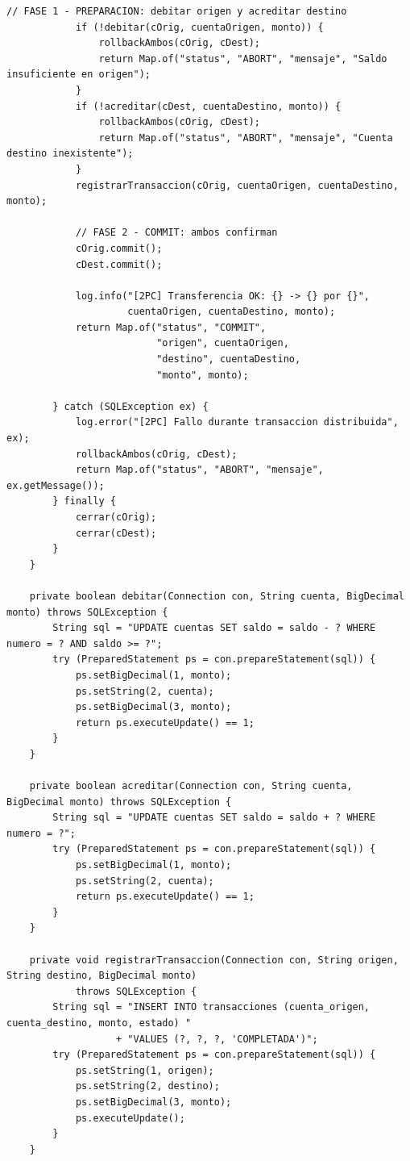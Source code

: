 \documentclass[11pt,a4paper]{article}
\begin{document}
\begin{lstlisting}[style=JavaStyle,caption={TransferenciaService.java: simulacion didactica de 2PC en capa de aplicacion}]
            // FASE 1 - PREPARACION: debitar origen y acreditar destino
            if (!debitar(cOrig, cuentaOrigen, monto)) {
                rollbackAmbos(cOrig, cDest);
                return Map.of("status", "ABORT", "mensaje", "Saldo insuficiente en origen");
            }
            if (!acreditar(cDest, cuentaDestino, monto)) {
                rollbackAmbos(cOrig, cDest);
                return Map.of("status", "ABORT", "mensaje", "Cuenta destino inexistente");
            }
            registrarTransaccion(cOrig, cuentaOrigen, cuentaDestino, monto);

            // FASE 2 - COMMIT: ambos confirman
            cOrig.commit();
            cDest.commit();

            log.info("[2PC] Transferencia OK: {} -> {} por {}",
                     cuentaOrigen, cuentaDestino, monto);
            return Map.of("status", "COMMIT",
                          "origen", cuentaOrigen,
                          "destino", cuentaDestino,
                          "monto", monto);

        } catch (SQLException ex) {
            log.error("[2PC] Fallo durante transaccion distribuida", ex);
            rollbackAmbos(cOrig, cDest);
            return Map.of("status", "ABORT", "mensaje", ex.getMessage());
        } finally {
            cerrar(cOrig);
            cerrar(cDest);
        }
    }

    private boolean debitar(Connection con, String cuenta, BigDecimal monto) throws SQLException {
        String sql = "UPDATE cuentas SET saldo = saldo - ? WHERE numero = ? AND saldo >= ?";
        try (PreparedStatement ps = con.prepareStatement(sql)) {
            ps.setBigDecimal(1, monto);
            ps.setString(2, cuenta);
            ps.setBigDecimal(3, monto);
            return ps.executeUpdate() == 1;
        }
    }

    private boolean acreditar(Connection con, String cuenta, BigDecimal monto) throws SQLException {
        String sql = "UPDATE cuentas SET saldo = saldo + ? WHERE numero = ?";
        try (PreparedStatement ps = con.prepareStatement(sql)) {
            ps.setBigDecimal(1, monto);
            ps.setString(2, cuenta);
            return ps.executeUpdate() == 1;
        }
    }

    private void registrarTransaccion(Connection con, String origen, String destino, BigDecimal monto)
            throws SQLException {
        String sql = "INSERT INTO transacciones (cuenta_origen, cuenta_destino, monto, estado) "
                   + "VALUES (?, ?, ?, 'COMPLETADA')";
        try (PreparedStatement ps = con.prepareStatement(sql)) {
            ps.setString(1, origen);
            ps.setString(2, destino);
            ps.setBigDecimal(3, monto);
            ps.executeUpdate();
        }
    }


\end{lstlisting}
\end{document}
